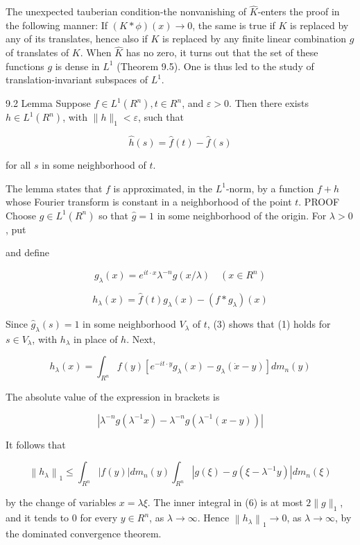 \documentclass[10pt]{article}
\begin{document}
The unexpected tauberian condition-the nonvanishing of $\hat{K}$-enters the proof in the following manner: If $(K * \phi)(x) \rightarrow 0$, the same is true if $K$ is replaced by any of its translates, hence also if $K$ is replaced by any finite linear combination $g$ of translates of $K$. When $\widehat{K}$ has no zero, it turns out that the set of these functions $g$ is dense in $L^{1}$ (Theorem 9.5). One is thus led to the study of translation-invariant subspaces
of $L^{1}$.

9.2 Lemma Suppose $f \in L^{1}\left(R^{n}\right), t \in R^{n}$, and $\varepsilon>0$. Then there exists $h \in L^{1}\left(R^{n}\right)$, with $\|h\|_{1}<\varepsilon$, such that

$$
\hat{h}(s)=\hat{f}(t)-\hat{f}(s)
$$

for all $s$ in some neighborhood of $t$.

The lemma states that $f$ is approximated, in the $L^{1}$-norm, by a function $f+h$ whose Fourier transform is constant in a neighborhood of the point $t$. PROOF Choose $g \in L^{1}\left(R^{n}\right)$ so that $\hat{g}=1$ in some neighborhood of the origin.
For $\lambda>0$, put

and define

$$
g_{\lambda}(x)=e^{i t \cdot x} \lambda^{-n} g(x / \lambda) \quad\left(x \in R^{n}\right)
$$

$$
h_{\lambda}(x)=\hat{f}(t) g_{\lambda}(x)-\left(f * g_{\lambda}\right)(x)
$$

Since $\hat{g}_{\lambda}(s)=1$ in some neighborhood $V_{\lambda}$ of $t$, (3) shows that (1) holds for $s \in V_{\lambda}$, with $h_{\lambda}$ in place of $h$. Next,

$$
h_{\lambda}(x)=\int_{R^{n}} f(y)\left[e^{-i t \cdot y} g_{\lambda}(x)-g_{\lambda}(\dot{x}-y)\right] d m_{n}(y)
$$

The absolute value of the expression in brackets is

$$
\left|\lambda^{-n} g\left(\lambda^{-1} x\right)-\lambda^{-n} g\left(\lambda^{-1}(x-y)\right)\right|
$$

It follows that

$$
\left\|h_{\lambda}\right\|_{1} \leq \int_{R^{n}}|f(y)| d m_{n}(y) \int_{R^{n}}\left|g(\xi)-g\left(\xi-\lambda^{-1} y\right)\right| d m_{n}(\xi)
$$

by the change of variables $x=\lambda \xi$. The inner integral in (6) is at most $2\|g\|_{1}$, and it tends to 0 for every $y \in R^{n}$, as $\lambda \rightarrow \infty$. Hence $\left\|h_{\lambda}\right\|_{1} \rightarrow 0$, as $\lambda \rightarrow \infty$, by the dominated convergence theorem.
\end{document}
